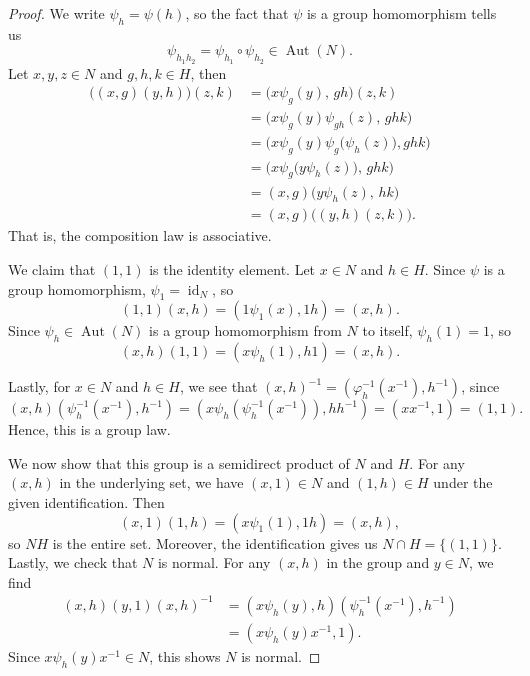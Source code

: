 \documentclass[12pt]{article}
\renewcommand{\phi}{\varphi}
\newcommand{\<}{\langle}
\renewcommand{\>}{\rangle}
\DeclareMathOperator{\id}{id}
\DeclareMathOperator{\Aut}{Aut}
\begin{document}
\begin{proof}
    We write $\psi_h = \psi(h)$, so the fact that $\psi$ is a group homomorphism tells us
    \[
        \psi_{h_1h_2} = \psi_{h_1} \circ \psi_{h_2} \in \Aut(N).
    \]
    Let $x, y, z \in N$ and $g, h, k \in H$, then
    \begin{align*}
        \big((x, g)(y, h)\big)(z, k)
            &= \big(x\psi_g(y),\, gh\big)(z, k) \\
            &= \big(x\psi_g(y)\psi_{gh}(z),\, ghk\big) \\
            &= \big(x\psi_g(y)\psi_g\big(\psi_h(z)\big), ghk\big) \\
            &= \big(x\psi_g\big(y\psi_h(z)\big),\, ghk\big) \\
            &= (x, g)\big(y\psi_h(z),\, hk\big) \\
            &= (x, g)\big((y, h)(z, k)\big).
    \end{align*}
    That is, the composition law is associative.

    We claim that $(1, 1)$ is the identity element. Let $x \in N$ and $h \in H$. Since $\psi$ is a group homomorphism, $\psi_1 = \id_N$, so
    \[
        (1, 1)(x, h)
            = (1\psi_1(x), 1h)
            = (x, h).
    \]
    Since $\psi_h \in \Aut(N)$ is a group homomorphism from $N$ to itself, $\psi_h(1) = 1$, so
    \[
        (x, h)(1, 1)
            = (x\psi_h(1), h1)
            = (x, h).
    \]

    Lastly, for $x \in N$ and $h \in H$, we see that $(x, h)^{-1} =(\phi_h^{-1}(x^{-1}), h^{-1})$, since
    \[
        (x, h)(\psi_h^{-1}(x^{-1}), h^{-1})
            = (x\psi_h(\psi_h^{-1}(x^{-1})), hh^{-1})
            = (xx^{-1}, 1)
            = (1, 1).
    \]
    Hence, this is a group law.
    
    We now show that this group is a semidirect product of $N$ and $H$. For any $(x, h)$ in the underlying set, we have $(x, 1) \in N$ and $(1, h) \in H$ under the given identification. Then
    \[
        (x, 1)(1, h)
            = (x\psi_1(1), 1h)
            = (x, h),
    \]
    so $NH$ is the entire set. Moreover, the identification gives us $N \cap H = \{(1, 1)\}$. Lastly, we check that $N$ is normal. For any $(x, h)$ in the group and $y \in N$, we find
    \begin{align*}
        (x, h)(y, 1)(x, h)^{-1}
            &= (x\psi_h(y), h)(\psi_h^{-1}(x^{-1}), h^{-1}) \\
            &= (x\psi_h(y)x^{-1}, 1).
    \end{align*}
    Since $x\psi_h(y)x^{-1} \in N$, this shows $N$ is normal.

\end{proof}
\end{document}
